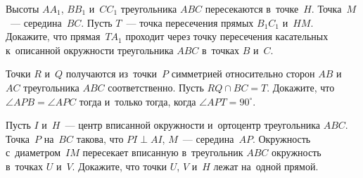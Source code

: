 \begin{problems}
\item
Высоты $AA_{1}$, $BB_{1}$ и~$CC_{1}$ треугольника $ABC$ пересекаются
в~точке~$H$.
Точка~$M$~--- середина~$BC$.
Пусть $T$~--- точка пересечения прямых $B_{1}C_{1}$ и~$HM$.
Докажите, что прямая~$TA_{1}$ проходит через точку пересечения касательных
к~описанной окружности треугольника $ABC$ в~точках $B$ и~$C$.

\item
Точки $R$ и~$Q$ получаются из~точки~$P$ симметрией относительно
сторон $AB$ и~$AC$ треугольника $ABC$ соответственно.
Пусть $RQ \cap BC=T$.
Докажите, что $\angle APB = \angle APC$ тогда и~только тогда, когда
$\angle APT = 90^{\circ}$.

\item
Пусть $I$ и~$H$~--- центр вписанной окружности и~ортоцентр треугольника $ABC$.
Точка~$P$ на~$BC$ такова, что $PI \perp AI$, $M$~--- середина~$AP$.
Окружность с~диаметром~$IM$ пересекает вписанную в~треугольник $ABC$ окружность
в~точках $U$ и~$V$.
Докажите, что точки $U$, $V$ и~$H$ лежат на~одной прямой.

\end{problems}

